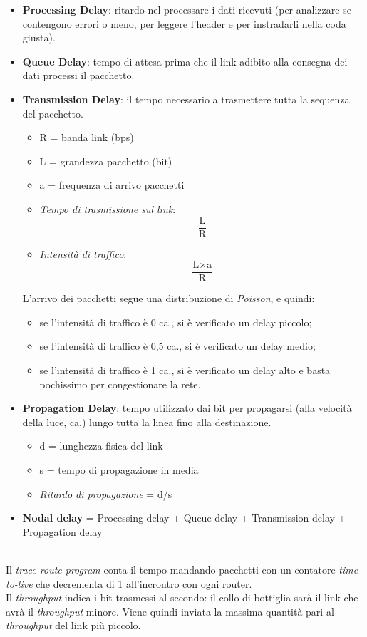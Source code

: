 \begin{itemize}
	\item \textbf{Processing Delay}: ritardo nel processare i dati ricevuti (per analizzare se contengono errori o meno, per leggere l'header e per instradarli nella coda giusta).
	\item \textbf{Queue Delay}: tempo di attesa prima che il link adibito alla consegna dei dati processi il pacchetto.
	\item \textbf{Transmission Delay}: il tempo necessario a trasmettere tutta la sequenza del pacchetto.
	\begin{itemize}
		\item R = banda link (bps)
		\item L = grandezza pacchetto (bit)
		\item a = frequenza di arrivo pacchetti
		\item \textit{Tempo di trasmissione sul link}: \[\frac{\text{L}}{\text{R}}\]
		\item \textit{Intensità di traffico}: \[\frac{\text{L}\times\text{a}}{\text{R}}\]
	\end{itemize}
	L'arrivo dei pacchetti segue una distribuzione di \textit{Poisson}, e quindi:
	\begin{itemize}
	    \item se l'intensità di traffico è 0 ca., si è verificato un delay piccolo;
	    \item se l'intensità di traffico è 0,5 ca., si è verificato un delay medio;
	    \item se l'intensità di traffico è 1 ca., si è verificato un delay alto e basta pochissimo per congestionare la rete.
	\end{itemize}
	\item \textbf{Propagation Delay}: tempo utilizzato dai bit per propagarsi (alla velocità della luce, ca.) lungo tutta la linea fino alla destinazione.
	\begin{itemize}
		\item d = lunghezza fisica del link
		\item s = tempo di propagazione in media
		\item \textit{Ritardo di propagazione} = d/s
	\end{itemize}
	\item \textbf{Nodal delay} = Processing delay + Queue delay + Transmission delay + Propagation delay
\end{itemize}
\\
Il \textit{trace route program} conta il tempo mandando pacchetti con un contatore \textit{time-to-live} che decrementa di 1 all'incrontro con ogni router.
\\
Il \textit{throughput} indica i bit trasmessi al secondo: il collo di bottiglia sarà il link che avrà il \textit{throughput} minore. Viene quindi inviata la massima quantità pari al \textit{throughput} del link più piccolo.